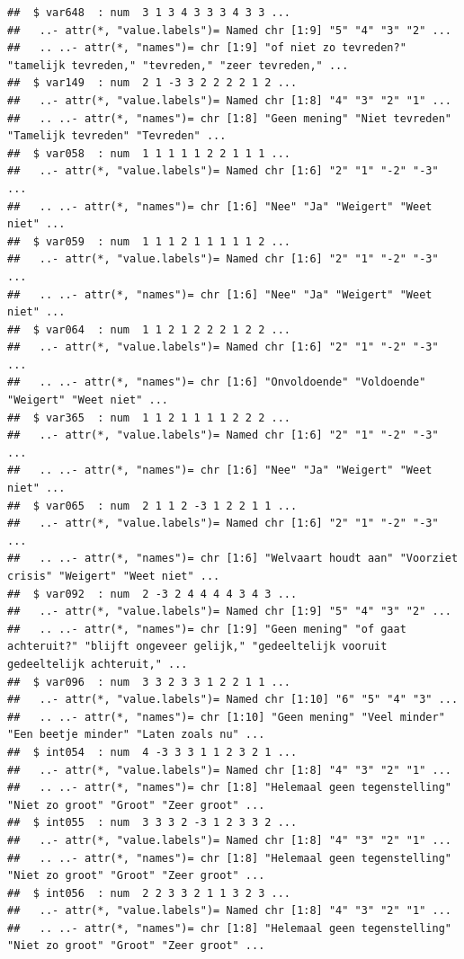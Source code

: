 \documentclass[
]{book}
\begin{document}
\begin{verbatim}
##  $ var648  : num  3 1 3 4 3 3 3 4 3 3 ...
##   ..- attr(*, "value.labels")= Named chr [1:9] "5" "4" "3" "2" ...
##   .. ..- attr(*, "names")= chr [1:9] "of niet zo tevreden?" "tamelijk tevreden," "tevreden," "zeer tevreden," ...
##  $ var149  : num  2 1 -3 3 2 2 2 2 1 2 ...
##   ..- attr(*, "value.labels")= Named chr [1:8] "4" "3" "2" "1" ...
##   .. ..- attr(*, "names")= chr [1:8] "Geen mening" "Niet tevreden" "Tamelijk tevreden" "Tevreden" ...
##  $ var058  : num  1 1 1 1 1 2 2 1 1 1 ...
##   ..- attr(*, "value.labels")= Named chr [1:6] "2" "1" "-2" "-3" ...
##   .. ..- attr(*, "names")= chr [1:6] "Nee" "Ja" "Weigert" "Weet niet" ...
##  $ var059  : num  1 1 1 2 1 1 1 1 1 2 ...
##   ..- attr(*, "value.labels")= Named chr [1:6] "2" "1" "-2" "-3" ...
##   .. ..- attr(*, "names")= chr [1:6] "Nee" "Ja" "Weigert" "Weet niet" ...
##  $ var064  : num  1 1 2 1 2 2 2 1 2 2 ...
##   ..- attr(*, "value.labels")= Named chr [1:6] "2" "1" "-2" "-3" ...
##   .. ..- attr(*, "names")= chr [1:6] "Onvoldoende" "Voldoende" "Weigert" "Weet niet" ...
##  $ var365  : num  1 1 2 1 1 1 1 2 2 2 ...
##   ..- attr(*, "value.labels")= Named chr [1:6] "2" "1" "-2" "-3" ...
##   .. ..- attr(*, "names")= chr [1:6] "Nee" "Ja" "Weigert" "Weet niet" ...
##  $ var065  : num  2 1 1 2 -3 1 2 2 1 1 ...
##   ..- attr(*, "value.labels")= Named chr [1:6] "2" "1" "-2" "-3" ...
##   .. ..- attr(*, "names")= chr [1:6] "Welvaart houdt aan" "Voorziet crisis" "Weigert" "Weet niet" ...
##  $ var092  : num  2 -3 2 4 4 4 4 3 4 3 ...
##   ..- attr(*, "value.labels")= Named chr [1:9] "5" "4" "3" "2" ...
##   .. ..- attr(*, "names")= chr [1:9] "Geen mening" "of gaat achteruit?" "blijft ongeveer gelijk," "gedeeltelijk vooruit  gedeeltelijk achteruit," ...
##  $ var096  : num  3 3 2 3 3 1 2 2 1 1 ...
##   ..- attr(*, "value.labels")= Named chr [1:10] "6" "5" "4" "3" ...
##   .. ..- attr(*, "names")= chr [1:10] "Geen mening" "Veel minder" "Een beetje minder" "Laten zoals nu" ...
##  $ int054  : num  4 -3 3 3 1 1 2 3 2 1 ...
##   ..- attr(*, "value.labels")= Named chr [1:8] "4" "3" "2" "1" ...
##   .. ..- attr(*, "names")= chr [1:8] "Helemaal geen tegenstelling" "Niet zo groot" "Groot" "Zeer groot" ...
##  $ int055  : num  3 3 3 2 -3 1 2 3 3 2 ...
##   ..- attr(*, "value.labels")= Named chr [1:8] "4" "3" "2" "1" ...
##   .. ..- attr(*, "names")= chr [1:8] "Helemaal geen tegenstelling" "Niet zo groot" "Groot" "Zeer groot" ...
##  $ int056  : num  2 2 3 3 2 1 1 3 2 3 ...
##   ..- attr(*, "value.labels")= Named chr [1:8] "4" "3" "2" "1" ...
##   .. ..- attr(*, "names")= chr [1:8] "Helemaal geen tegenstelling" "Niet zo groot" "Groot" "Zeer groot" ...

\end{verbatim}
\end{document}
